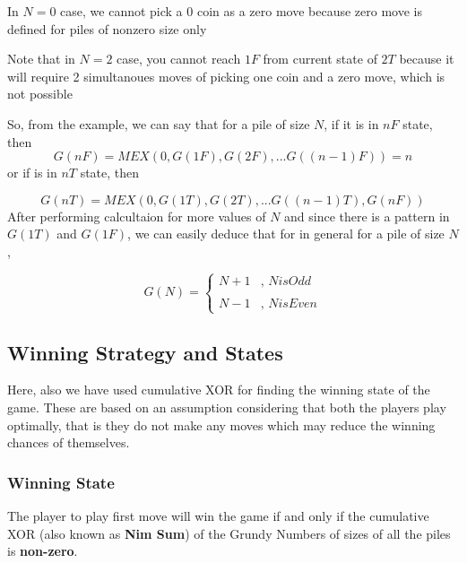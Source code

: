 \documentclass[11pt]{article}
\begin{document}
\begin{remark}
    In $N = 0$ case, we cannot pick a 0 coin as a zero move because zero move is defined for piles of nonzero size only
\end{remark}
\begin{remark}
    Note that in $N = 2$ case, you cannot reach $1F$ from current state of $2T$ because it will require 2 simultanoues moves of picking one coin and a zero move, which is not possible
\end{remark}

So, from the example, we can say that for a pile of size $N$, if it is in $nF$ state, then 
\begin{equation*}
    G(nF) = MEX({0,G(1F), G(2F), ... G((n-1)F)}) = n
\end{equation*}
or if is in $nT$ state, then

\begin{equation*}
    G(nT) = MEX({0, G(1T), G(2T), ... G((n-1)T), G(nF)})
\end{equation*}
After performing calcultaion for more values of $N$ and since there is a pattern in $G(1T)$ and $G(1F)$, we can easily deduce that for in general for a pile of size $N$, 

\begin{formulae}
\begin{equation*}
    G(N) = 
\left\{
	\begin{array}{cc}
		N + 1  & \mbox{, } N is Odd \\ \\
		N - 1 & \mbox{, } N is Even
	\end{array}
\right.
\end{equation*}
\end{formulae}

\subsection{Winning Strategy and States}
Here, also we have used cumulative XOR for finding the winning state of the game. These are based on an assumption considering that both the players play optimally, that is they do not make any moves which may reduce the winning chances of themselves. 
\subsubsection{Winning State}
\begin{properties}
The player to play first move will win the game if and only if the cumulative XOR (also known as \textbf{Nim Sum}) of the Grundy Numbers of sizes of all the piles is \textbf{non-zero}. 
\end{properties}
\end{document}
